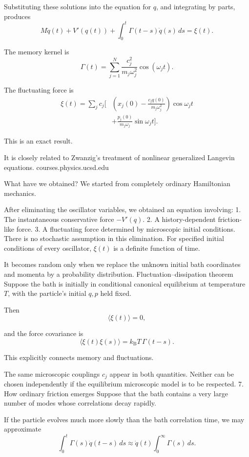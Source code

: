 Substituting these solutions into the equation for \(q\), and integrating by parts, produces
\[
\boxed{
M\ddot q(t)+V'(q(t))
+\int_0^t\Gamma(t-s)\dot q(s)\,ds
=\xi(t).
}
\]

The memory kernel is
\[
\boxed{
\Gamma(t)=
\sum_{j=1}^N
\frac{c_j^2}{m_j\omega_j^2}
\cos(\omega_jt).
}
\]

The fluctuating force is
\[
\boxed{
\begin{aligned}
\xi(t)=\sum_jc_j\bigg[
&\left(x_j(0)-\frac{c_jq(0)}{m_j\omega_j^2}\right)
\cos\omega_jt\\
&+\frac{p_j(0)}{m_j\omega_j}\sin\omega_jt
\bigg].
\end{aligned}
}
\]

This is an exact result.

It is closely related to Zwanzig's treatment of nonlinear generalized Langevin equations. 
courses.physics.ucsd.edu

What have we obtained?
We started from completely ordinary Hamiltonian mechanics.

After eliminating the oscillator variables, we obtained an equation involving:
1. The instantaneous conservative force \(-V'(q)\).
2. A history-dependent friction-like force.
3. A fluctuating force determined by microscopic initial conditions.
There is no stochastic assumption in this elimination. For specified initial conditions of every oscillator, \(\xi(t)\) is a definite function of time.

It becomes random only when we replace the unknown initial bath coordinates and momenta by a probability distribution.
Fluctuation–dissipation theorem
Suppose the bath is initially in conditional canonical equilibrium at temperature \(T\), with the particle's initial \(q,p\) held fixed.

Then
\[
\langle\xi(t)\rangle=0,
\]

and the force covariance is
\[
\boxed{
\langle\xi(t)\xi(s)\rangle
=
k_{\mathrm B}T\,\Gamma(t-s).
}
\]

This explicitly connects memory and fluctuations.

The same microscopic couplings \(c_j\) appear in both quantities. Neither can be chosen independently if the equilibrium microscopic model is to be respected.
7. How ordinary friction emerges
Suppose that the bath contains a very large number of modes whose correlations decay rapidly.

If the particle evolves much more slowly than the bath correlation time, we may approximate
\[
\int_0^t\Gamma(s)\dot q(t-s)\,ds
\approx
\dot q(t)\int_0^\infty\Gamma(s)\,ds.
\]

